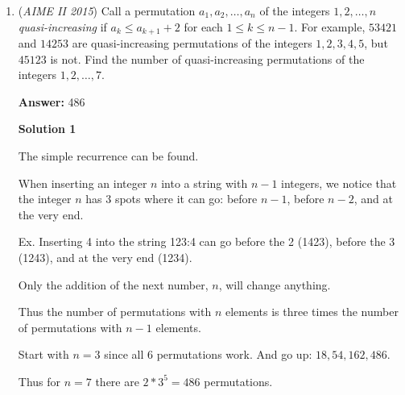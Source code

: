 \begin{enumerate}
 



\textbf{Solution 5(Similarity)}

First, note the diagonal is vertical so that the tetrahedron of cube in water is similar to the largest tetrahedron in the bottom of this cube. So we are trying to find their volume ratio by discovering their side length ration.

 In the equilateral triangle at the cylinder's top, we can find its side is 
 \[s_{1} = 2 * R * \sin(60^{\circ}) = 4\sqrt{3}\] as the base side of this tetrahedron.

 For the largest tetrahedron in the cube, its side length is just 
 \[s_{2} = 8\sqrt{2}\] a diagonal of one of the face. And its volume is 
 \[v_{2} = 8 * 8 * \frac{1}{2} * 8 * \frac{1}{3} = \frac{8^3}{6}\].

 Therefore, 
 \[v_{1} = v_{2} * (\frac{s_{1}}{s_{2}})^3 = 8\sqrt{6}\]
 \[v_{1}^2 = 384\]



	\item (\textit{AIME II 2015}) Call a permutation $a_1, a_2, \ldots, a_n$ of the integers $1, 2, \ldots, n$ \textit{quasi-increasing} if $a_k \leq a_{k+1} + 2$ for each $1 \leq k \leq n-1$. For example, $53421$ and $14253$ are quasi-increasing permutations of the integers $1, 2, 3, 4, 5$, but $45123$ is not. Find the number of quasi-increasing permutations of the integers $1, 2, \ldots, 7$.


 
 \textbf{Answer: }486



\textbf{Solution 1}

The simple recurrence can be found.

 When inserting an integer $n$ into a string with $n - 1$ integers, we notice that the integer $n$ has 3 spots where it can go: before $n - 1$, before $n - 2$, and at the very end.

 Ex. Inserting 4 into the string 123:4 can go before the 2 (1423), before the 3 (1243), and at the very end (1234).

 Only the addition of the next number, $n$, will change anything.

 Thus the number of permutations with $n$ elements is three times the number of permutations with $n-1$ elements. 

 Start with $n=3$ since all $6$ permutations work. And go up: $18, 54, 162, 486$.

 Thus for $n=7$ there are $2*3^5=\boxed{486}$ permutations.


\end{enumerate}
